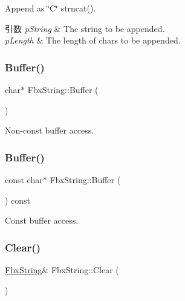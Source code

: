 Append as \char`\"{}\+C\char`\"{} strncat(). 
\begin{DoxyParams}{引数}
{\em p\+String} & The string to be appended. \\
\hline
{\em p\+Length} & The length of chars to be appended. \\
\hline
\end{DoxyParams}
\mbox{\label{class_fbx_string_ac41dc796638cda32faebf887a88e769b}} 
\subsubsection{\texorpdfstring{Buffer()}{Buffer()}\hspace{0.1cm}{\footnotesize\ttfamily [1/2]}}
{\footnotesize\ttfamily char$\ast$ Fbx\+String\+::\+Buffer (\begin{DoxyParamCaption}{ }\end{DoxyParamCaption})}



Non-\/const buffer access. 

\mbox{\label{class_fbx_string_af23b5752c4eb99775b7cdca217e884fc}} 
\subsubsection{\texorpdfstring{Buffer()}{Buffer()}\hspace{0.1cm}{\footnotesize\ttfamily [2/2]}}
{\footnotesize\ttfamily const char$\ast$ Fbx\+String\+::\+Buffer (\begin{DoxyParamCaption}{ }\end{DoxyParamCaption}) const}



Const buffer access. 

\mbox{\label{class_fbx_string_a8adc4e498591b2ed324da12db298cede}} 
\subsubsection{\texorpdfstring{Clear()}{Clear()}}
{\footnotesize\ttfamily \hyperlink{class_fbx_string}{Fbx\+String}\& Fbx\+String\+::\+Clear (\begin{DoxyParamCaption}{ }\end{DoxyParamCaption})}



